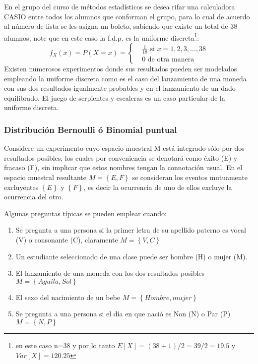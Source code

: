 \begin{example}
    En el grupo del curso de métodos
    estadísticos se desea rifar una calculadora
    CASIO entre todos los alumnos que
    conforman el grupo, para lo cual de acuerdo
    al número de lista se les asigna un boleto,
    sabiendo que existe un total de 38 alumnos,
    note que en este caso la f.d.p. es la
    uniforme discreta\footnote{en este caso n=38 y por lo tanto $E\left[X\right]=(38+1)/2=39/2=19.5$ y $Var\left[X\right]=120.25$}:
    \begin{equation*}
        f_X(x)=P(X=x)=\begin{cases} & \frac{1}{18}\text{ si }x=1,2,3,\dots ,38 \\
              & 0\text{ de otra manera}
        \end{cases}
    \end{equation*}
    Existen numerosos experimentos donde
    sus resultados pueden ser modelados
    empleando la uniforme discreta como es
    el caso del lanzamiento de una moneda
    con sus dos resultados igualmente
    probables y en el lanzamiento de un dado
    equilibrado. El juego de serpientes y escaleras es un caso particular de
    la uniforme discreta.
\end{example}

\subsubsection{Distribución Bernoulli ó Binomial puntual}

Considere un experimento cuyo espacio muestral M está integrado sólo por dos resultados posibles, los cuales por conveniencia se denotará como éxito (E) y fracaso (F), sin implicar que estos nombres tengan la connotación usual. En el espacio muestral resultante $M=\left\{E,F\right\}$ se consideran los eventos mutuamente excluyentes $\left\{E\right\} $ y $\left\{F\right\} $, es decir la ocurrencia de uno de ellos excluye la ocurrencia del otro.

Algunas preguntas típicas se pueden emplear cuando:

\begin{enumerate}
    \item Se pregunta a una persona si la primer letra de su apellido paterno es
          vocal (V) o consonante (C), claramente $M=\left\{V,C\right\}$
    \item Un estudiante seleccionado de una clase puede ser hombre (H) o mujer
          (M).
    \item  El lanzamiento de una moneda con los dos resultados posibles $M=\left\{Aguila,Sol\right\}$
    \item  El sexo del nacimiento de un bebe $M=\left\{Hombre, mujer\right\}$
    \item  Se pregunta a una persona si el día en que nació es Non (N) o Par (P)
          $M=\left\{N,P\right\}$
\end{enumerate}

